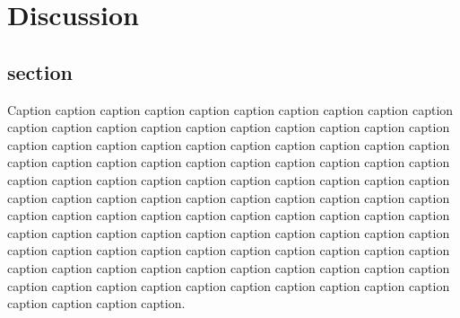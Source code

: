 \section{Discussion}

\subsection{section}
Caption caption caption caption caption caption caption caption caption caption caption caption caption caption caption caption caption caption caption caption caption caption caption caption caption caption caption caption caption caption caption caption caption caption caption caption caption caption caption caption caption caption caption caption caption caption caption caption caption caption caption caption caption caption caption caption caption caption caption caption caption caption caption caption caption caption caption caption caption caption caption caption caption caption caption caption caption caption caption caption caption caption caption caption caption caption caption caption caption caption caption caption caption caption caption caption caption caption caption caption caption caption caption caption caption caption caption caption caption caption caption caption caption caption. \cite{davila2018consensus}


